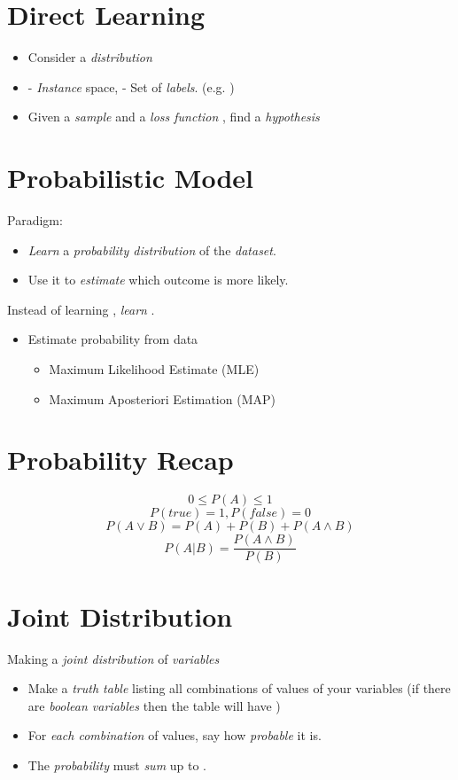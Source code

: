 \documentclass[
	number={3},
	title={Na\"{\i}ive Bayes Learning}
]{cs584notes}
\begin{document}
\section{Direct Learning}\label{sec:direct-learning}
\begin{itemize}
	\item Consider a \emph{distribution} 
	\item {} - \emph{Instance} space,  - Set of \emph{labels}. (e.g. )
	\item Given a \emph{sample}  and a \emph{loss function} , find a \emph{hypothesis}
\end{itemize}

\section{Probabilistic Model}\label{sec:probabilistic-model}
Paradigm:
\begin{itemize}
	\item \emph{Learn} a \emph{probability distribution} of the \emph{dataset}.
	\item Use it to \emph{estimate} which outcome is more likely.
\end{itemize}

Instead of learning , \emph{learn} .

\begin{itemize}
	\item Estimate probability from data
	\begin{itemize}
		\item Maximum Likelihood Estimate (MLE)
		\item Maximum Aposteriori Estimation (MAP)
	\end{itemize}
\end{itemize}

\section{Probability Recap}\label{sec:probability-recap}
\[ 0 \leq P(A) \leq 1 \]
\[ P(true) = 1, P(false) = 0 \]
\[ P(A \lor B) = P(A) + P(B) + P(A \land B) \]
\[ P(A|B) = \frac{P(A\land B)}{{P(B)}} \]

\section{Joint Distribution}\label{sec:joint-distribution}
Making a \emph{joint distribution} of  \emph{variables}
\begin{itemize}
	\item Make a \emph{truth table} listing all combinations of values of your variables (if there are  \emph{boolean variables} then the table will have )
	\item For \emph{each combination} of values, say how \emph{probable} it is.
	\item The \emph{probability} must \emph{sum} up to .
\end{itemize}
\end{document}
